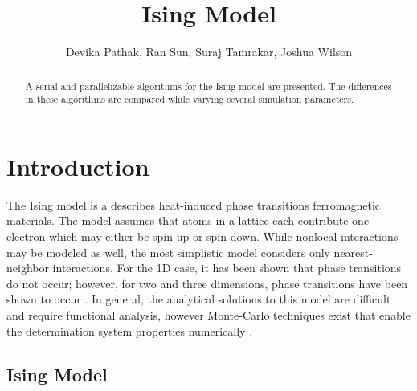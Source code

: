 \documentclass{llncs}
\begin{document}
\title{Ising Model}
%
%
\author{Devika Pathak, Ran Sun, Suraj Tamrakar, Joshua Wilson}
%
%
%

\maketitle              %

\begin{abstract}
A serial and parallelizable algorithms for the Ising model are presented. 
The differences in these  algorithms are compared while varying several simulation parameters. 
\end{abstract}

\section{Introduction}
The Ising model is a describes heat-induced phase transitions ferromagnetic materials. The model assumes that atoms in a lattice each contribute one electron which may either be spin up or spin down. While nonlocal interactions may be modeled as well, the most simplistic model considers only nearest-neighbor interactions. For the 1D case, it has been shown that phase transitions do not occur; however, for two and three dimensions, phase transitions have been shown to occur \cite{onsager,weigel}. In general, the analytical solutions to this model are difficult and require functional analysis, however Monte-Carlo techniques exist that enable the determination system properties numerically \cite{rajeshrinet}. 
\subsection{Ising Model}
\end{document}
